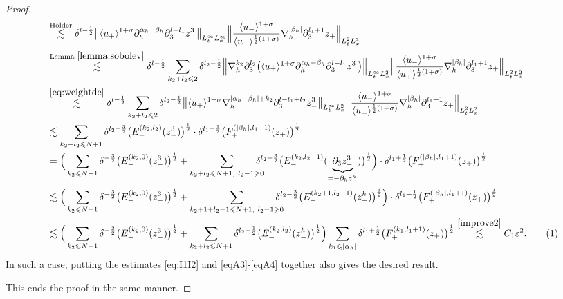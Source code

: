\documentclass[10pt,reqno]{amsart}
\numberwithin{equation}{section}
\begin{document}
\begin{proof}
\begin{align*}
		&\stackrel{\text{H\"older}}{\lesssim}\delta^{l-\frac{1}{2}}\big\|\langle u_+\rangle^{1+\sigma}\partial_h^{\alpha_h-\beta_h}\partial_3^{l-l_1}z_-^3\big\|_{L^\infty_tL^\infty_x}\Big\|\frac{\langle u_-\rangle^{1+\sigma}}{\langle u_+\rangle^{\frac{1}{2}(1+\sigma)}}\nabla_h^{|\beta_h|}\partial_3^{l_1+1} z_{+}\Big\|_{L^2_tL^2_x}\\
		&\stackrel{\text{Lemma } \ref{lemma:sobolev}}{\lesssim} \delta^{l-\frac{1}{2}}\sum_{k_2+l_2\leqslant 2}\delta^{l_2-\frac{1}{2}}\Big\|\nabla_h^{k_2}\partial_3^{l_2}\big(\langle u_+\rangle^{1+\sigma}\partial_h^{\alpha_h-\beta_h}\partial_3^{l-l_1}z_-^3\big)\Big\|_{L^\infty_tL^2_x}\Big\|\frac{\langle u_-\rangle^{1+\sigma}}{\langle u_+\rangle^{\frac{1}{2}(1+\sigma)}}\nabla_h^{|\beta_h|}\partial_3^{l_1+1} z_{+}\Big\|_{L^2_tL^2_x}\\
		&\stackrel{\eqref{eq:weightde}}{\lesssim} \delta^{l-\frac{1}{2}}\sum_{k_2+l_2\leqslant 2}\delta^{l_2-\frac{1}{2}}\big\|\langle u_+\rangle^{1+\sigma}\nabla_h^{|\alpha_h-\beta_h|+k_2}\partial_3^{l-l_1+l_2}z_-^3\big\|_{L^\infty_tL^2_x}\Big\|\frac{\langle u_-\rangle^{1+\sigma}}{\langle u_+\rangle^{\frac{1}{2}(1+\sigma)}}\nabla_h^{|\beta_h|}\partial_3^{l_1+1} z_{+}\Big\|_{L^2_tL^2_x}\\
		&\lesssim\sum_{k_2+l_2\leqslant N+1}\delta^{l_2-\frac{3}{2}} \big(E_-^{(k_2,l_2)}(z_-^3)\big)^{\frac{1}{2}}\cdot\delta^{l_1+\frac{1}{2}} \big(F_+^{(|\beta_h|,l_1+1)}(z_+)\big)^{\frac{1}{2}}\\
		&=\Big(\sum_{k_2\leqslant N+1}\delta^{-\frac{3}{2}} \big(E_-^{(k_2,0)}(z_-^3)\big)^{\frac{1}{2}}+\sum_{k_2+l_2\leqslant N+1,\ l_2-1\geqslant 0}\!\!\!\!\!\!\delta^{l_2-\frac{3}{2}} \big(E_-^{(k_2,l_2-1)}(\underbrace{\partial_3z_-^3}_{=-\partial_hz_-^h})\big)^{\frac{1}{2}}\Big)\cdot\delta^{l_1+\frac{1}{2}} \big(F_+^{(|\beta_h|,l_1+1)}(z_+)\big)^{\frac{1}{2}}\\
		&\lesssim\Big(\sum_{k_2\leqslant N+1}\delta^{-\frac{3}{2}} \big(E_-^{(k_2,0)}(z_-^3)\big)^{\frac{1}{2}}+\sum_{k_2+1+l_2-1\leqslant N+1,\ l_2-1\geqslant 0}\!\!\!\!\!\!\delta^{l_2-\frac{3}{2}} \big(E_-^{(k_2+1,l_2-1)}(z_-^h)\big)^{\frac{1}{2}}\Big)\cdot\delta^{l_1+\frac{1}{2}} \big(F_+^{(|\beta_h|,l_1+1)}(z_+)\big)^{\frac{1}{2}}\\
		&\lesssim\Big(\sum_{k_2\leqslant N+1}\delta^{-\frac{3}{2}} \big(E_-^{(k_2,0)}(z_-^3)\big)^{\frac{1}{2}}+\sum_{k_2+l_2\leqslant N+1}\delta^{l_2-\frac{1}{2}} \big(E_-^{(k_2,l_2)}(z_-^h)\big)^{\frac{1}{2}}\Big)\sum_{k_1\leqslant|\alpha_h|}\delta^{l_1+\frac{1}{2}} \big(F_+^{(k_1,l_1+1)}(z_+)\big)^{\frac{1}{2}}
		\stackrel{\eqref{improve2}}{\lesssim} C_1\varepsilon^2.\stepcounter{equation}\tag{\theequation}\label{eqA4}
	\end{align*}
	In such a case, putting the estimates \eqref{eq:I1I2} and \eqref{eqA3}-\eqref{eqA4} together also gives the desired result.
	
	
	This ends the proof in the same manner.
\end{proof}
\end{document}
